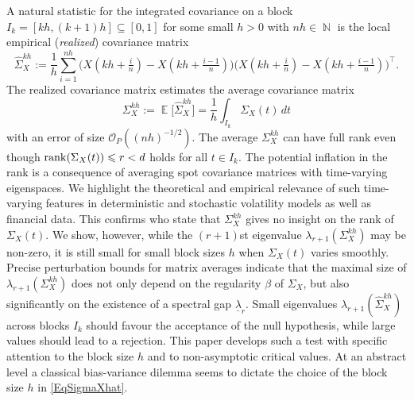 \documentclass[preprint,aos]{imsart}
\numberwithin{equation}{section}
\theoremstyle{remark}
\DeclareMathOperator{\E}{{\mathbb E}}
\DeclareMathOperator{\N}{{\mathbb N}}
\renewcommand{\subset}{\subseteq}
\renewcommand{\le}{\leqslant}
\begin{document}
A natural statistic for the integrated covariance on a block $I_k=[kh,(k+1)h]\subset[0,1]$ for some small $h>0$ with $nh\in\N$ is the local  empirical ({\it realized}) covariance matrix
\begin{equation}\label{EqSigmaXhat}
\hat\Sigma_X^{kh}:=\frac1h\sum_{i=1}^{nh}\big(X(kh+\tfrac in)-X(kh+\tfrac{i-1}n)\big)\big(X(kh+\tfrac in)-X(kh+\tfrac{i-1}n)\big)^\top.
\end{equation}
The realized covariance matrix estimates the average covariance matrix
\begin{equation}\Sigma_X^{kh}:=\E\big[\hat\Sigma_X^{kh}\big]=\frac1h\int_{I_k}\Sigma_X(t)\,dt\label{EqESigmakh}
\end{equation}
with an error of size ${\mathcal O}_P((nh)^{-1/2})$.
The average $\Sigma_X^{kh}$ can have full rank even though $\rank(\Sigma_X(t))\le r < d$ holds for all $t\in I_k$. The potential inflation in the rank is a consequence of averaging spot covariance matrices with time-varying eigenspaces. We highlight the theoretical and empirical relevance of such time-varying features in deterministic and stochastic volatility models as well as financial data. This confirms \cite{jacod2008} who state that $\Sigma_X^{kh}$ gives no insight on the rank of $\Sigma_X(t)$. We show, however, while the $(r+1)$st eigenvalue $\lambda_{r+1}(\Sigma_X^{kh})$ may be non-zero, it is
still small for small block sizes $h$ when $\Sigma_X(t)$ varies smoothly. Precise perturbation bounds for matrix averages indicate that the maximal size of $\lambda_{r+1}(\Sigma_X^{kh})$ does not only depend on the regularity $\beta$ of $\Sigma_X$, but also significantly on the existence of a spectral gap $\underline\lambda_r$. Small  eigenvalues $\lambda_{r+1}(\hat\Sigma_X^{kh})$ across blocks $I_k$ should favour the acceptance of the null hypothesis, while large values should lead to a rejection. This paper develops such a test with specific attention to the block size $h$ and to non-asymptotic critical values.  At an abstract level a classical bias-variance dilemma seems to dictate the choice of the block size $h$ in \eqref{EqSigmaXhat}.
\end{document}
